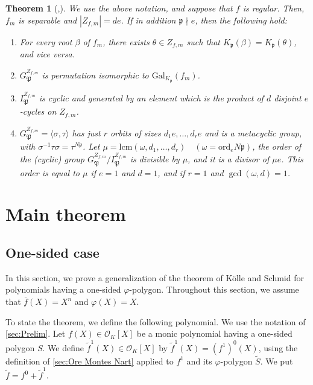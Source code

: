 \documentclass[10pt,a4paper]{amsart}
\newcommand{\Gal}{\mathrm{Gal}}
\newtheorem{theorem}{Theorem}[section]
\numberwithin{equation}{section}
\begin{document}
    \begin{theorem}[{\cite[Theorem]{MR2102807},\cite{MR2557856}}]\label{thm:theorem of Kölle Schmid}
      We use the above notation, and suppose that $f$ is regular. 
      Then, $f_m$ is separable and $|Z_{f,m}| = de$. 
      If in addition $\mathfrak{p} \nmid e$, then the following hold:
      \begin{enumerate}
        \item For every root $\beta$ of $f_m$, there exists $\theta \in Z_{f,m}$ such that $K_{\mathfrak{p}}(\beta) = K_{\mathfrak{p}}(\theta)$, and vice versa. 
        \item $G_{\mathfrak{P}}^{Z_{f,m}}$ is permutation isomorphic to $\Gal_{K_\mathfrak{p}}(f_m)$. 
        \item $I_{\mathfrak{P}}^{Z_{f,m}}$ is cyclic and generated by an element which is the product of $d$ disjoint $e$-cycles on $Z_{f,m}$. 
        \item $G_{\mathfrak{P}}^{Z_{f,m}} = \langle \sigma,\tau \rangle$ has just $r$ orbits of sizes $d_1 e, \dots ,d_r e$ 
          and is a metacyclic group, with $\sigma^{-1}\tau\sigma = \tau^{N\mathfrak{p}}$. 
          Let $\mu = \mathrm{lcm}(\omega,d_1, \dots ,d_r) \quad (\omega = \mathrm{ord}_e N\mathfrak{p})$, the order of the (cyclic) group $G_{\mathfrak{P}}^{Z_{f,m}}/I_{\mathfrak{P}}^{Z_{f,m}}$ 
          is divisible by $\mu$, and it is a divisor of $\mu e$. 
          This order is equal to $\mu$ if $e = 1$ and $d = 1$, and if $r = 1$ and $\gcd (\omega,d) = 1$. 
      \end{enumerate}
    \end{theorem}


\section{Main theorem}\label{sec:Main theorem}

  \subsection{One-sided case}\label{sec:One-sided}

  In this section, we prove a generalization of the theorem of Kölle and Schmid for polynomials having a one-sided $\varphi$-polygon. 
  Throughout this section, we assume that $\overline{f}(X) = X^n$ and $\varphi(X) = X$. 

  To state the theorem, we define the following polynomial. 
  We use the notation of \cref{sec:Prelim}. 
  Let $f(X) \in \mathcal{O}_K[X]$ be a monic polynomial having a one-sided polygon $S$. 
  We define $\tilde{f}^1(X) \in \mathcal{O}_K[X]$ by $\tilde{f}^1(X) = (f^1)^0(X)$, 
  using the definition of \cref{sec:Ore Montes Nart} applied to $f^1$ and its $\varphi$-polygon $\tilde{S}$. 
  We put $\tilde{f}=f^0 + \tilde{f}^1$. 
\end{document}
